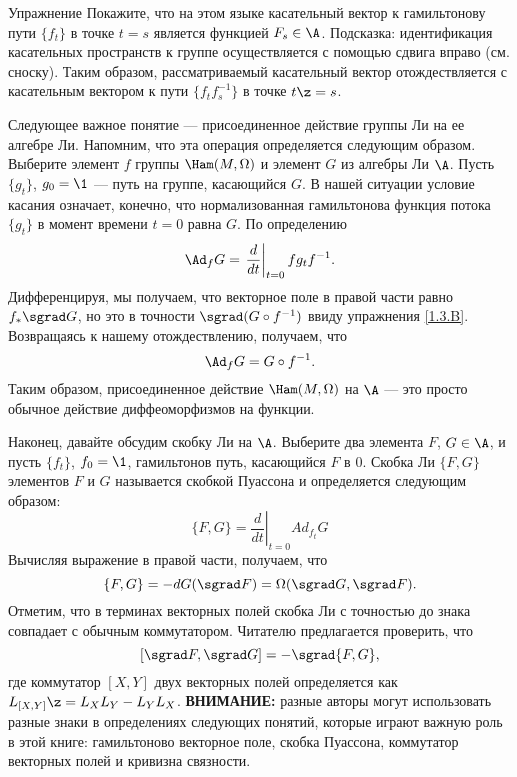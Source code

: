 \begin{thm}{Упражнение}\label{1.4.G}
Покажите, что на этом языке касательный вектор к гамильтонову пути $\{f_t\}$ в точке $t = s$ является функцией $F_s \in \A$.
Подсказка: идентификация касательных пространств к группе осуществляется с помощью сдвига вправо (см. сноску).
Таким образом, рассматриваемый касательный вектор отождествляется с касательным вектором к пути $\{f_tf_s^{-1}\}$ в точке $t \z= s$.
\end{thm}

Следующее важное понятие --- присоединенное действие группы Ли на ее алгебре Ли.
Напомним, что эта операция определяется следующим образом.
Выберите элемент $f$ группы $\Ham (M, \Omega)$ и элемент $G$ из алгебры Ли $\A$.
Пусть $\{g_t\}$, $g_0 = \1$ --- путь на группе, касающийся $G$.
В нашей ситуации условие касания означает, конечно, что нормализованная гамильтонова функция потока $\{g_t\}$ в момент времени $t = 0$ равна $G$.
По определению 
\[\Ad_f G = \left.\frac{d}{dt}\right|_{t=0} fg_tf^{-1}.\]
Дифференцируя, мы получаем, что векторное поле в правой части равно $f_\ast \sgrad G$, но это в точности $\sgrad  (G\circ f^{-1})$ ввиду упражнения \ref{1.3.B}.
Возвращаясь к нашему отождествлению, получаем, что 
\[\Ad_f G = G \circ f^{-1}.\]
Таким образом, присоединенное действие $\Ham (M, \Omega)$ на $\A$ --- это просто обычное действие диффеоморфизмов на функции.

Наконец, давайте обсудим скобку Ли на $\A$.
Выберите два элемента $F$, $G \in \A$, и пусть $\{f_t\}$, $f_0 = \1$, гамильтонов путь, касающийся $F$ в $0$.
Скобка Ли $\{F, G\}$ элементов $F$ и $G$ называется скобкой Пуассона и определяется следующим образом: 
\[\{F, G\}=\left.\frac{d}{dt}\right|_{t=0}Ad_{f_t}G\]
Вычисляя выражение в правой части, получаем, что 
\[\{F, G\} = -dG (\sgrad F) = \Omega (\sgrad G, \sgrad F).\]
Отметим, что в терминах векторных полей скобка Ли с точностью до знака совпадает с обычным коммутатором.
Читателю предлагается проверить, что 
\[[\sgrad F, \sgrad G] = -\sgrad  \{F, G\},\]
где коммутатор $[X, Y]$ двух векторных полей определяется как $L_{[X, Y]} \z= L_X L_Y -L_Y L_X$.
\textbf{ВНИМАНИЕ:} разные авторы могут использовать разные знаки в определениях следующих понятий, которые играют важную роль в этой книге: гамильтоново векторное поле, скобка Пуассона, коммутатор векторных полей и кривизна связности.

